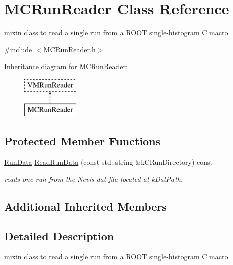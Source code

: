 \hypertarget{class_m_c_run_reader}{\section{M\+C\+Run\+Reader Class Reference}
\label{class_m_c_run_reader}
}


mixin class to read a single run from a R\+O\+O\+T single-\/histogram C macro  




{\ttfamily \#include $<$M\+C\+Run\+Reader.\+h$>$}

Inheritance diagram for M\+C\+Run\+Reader\+:\begin{figure}[H]
\begin{center}
\leavevmode
\includegraphics[height=2.000000cm]{class_m_c_run_reader}
\end{center}
\end{figure}
\subsection*{Protected Member Functions}
\begin{DoxyCompactItemize}
\item 
\hyperlink{class_v_m_run_reader_aa84c99e50235a10f563b3487b3930602}{Run\+Data} \hyperlink{class_m_c_run_reader_a1ff16203c127ce8158a9d490ea25ebd3}{Read\+Run\+Data} (const std\+::string \&k\+C\+Run\+Directory) const 
\begin{DoxyCompactList}\small\item\em reads one run from the Nevis dat file located at k\+Dat\+Path. \end{DoxyCompactList}\end{DoxyCompactItemize}
\subsection*{Additional Inherited Members}


\subsection{Detailed Description}
mixin class to read a single run from a R\+O\+O\+T single-\/histogram C macro 

